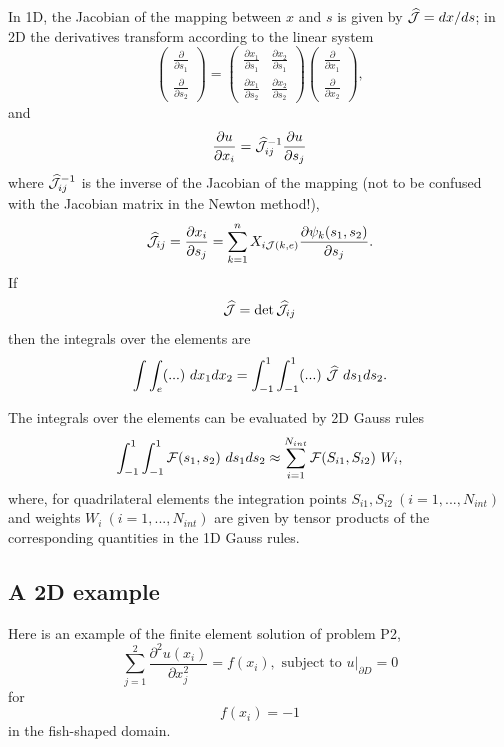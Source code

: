 In 1D, the Jacobian of the mapping between $x$ and $s$ is given by $ \widehat{\cal J} = dx/ds$; in 2D the derivatives transform according to the linear system \[ \left( \begin{array}{c} \frac{\partial }{\partial s_1} \\ \frac{\partial }{\partial s_2} \end{array} \right) = \left( \begin{array}{cc} \frac{\partial x_1 }{\partial s_1} & \frac{\partial x_2}{\partial s_1} \\ \frac{\partial x_1 }{\partial s_2} & \frac{\partial x_2}{\partial s_2} \end{array} \right) \left( \begin{array}{c} \frac{\partial }{\partial x_1} \\ \frac{\partial }{\partial x_2} \end{array} \right), \] and \[ \frac{\partial u}{\partial x_i} = \widehat{\cal J}_{ij}^{-1} \frac{\partial u}{\partial s_j} \] where $ \widehat{\cal J}_{ij}^{-1} $ is the inverse of the Jacobian of the mapping (not to be confused with the Jacobian matrix in the Newton method!), \[ \widehat{\cal J}_{ij} = \frac{\partial x_i}{\partial s_j} = \sum_{k=1}^n X_{i{\cal J}(k,e)} \frac{\partial \psi_k(s_1,s_2)}{\partial s_j}. \] If \[ \widehat{\cal J} = \det \widehat{\cal J}_{ij} \] then the integrals over the elements are \[ \int \int_e (...) \ dx_1 dx_2 = \int_{-1}^{1} \int_{-1}^{1} (...) \ \widehat{\cal J} \ ds_1 ds_2. \]

The integrals over the elements can be evaluated by 2D Gauss rules \[ \int_{-1}^1 \int_{-1}^1 {\cal F}(s_1,s_2) \ ds_1 ds_2 \approx \sum_{i=1}^{N_{int}} {\cal F}(S_{i1},S_{i2}) \ W_{i}, \] where, for quadrilateral elements the integration points $S_{i1},S_{i2} \ (i=1,...,N_{int})$ and weights $ W_{i} \ (i=1,...,N_{int})$ are given by tensor products of the corresponding quantities in the 1D Gauss rules.



\hypertarget{index_example_P2}{}\subsection{A 2\+D example}\label{index_example_P2}
Here is an example of the finite element solution of problem P2, \[ \sum_{j=1}^2 \frac{\partial^2 u(x_i)}{\partial x_j^2} = f(x_i), \mbox{\ \ \ subject to $u|_{\partial D}=0$} \] for \[ f(x_i) = -1\] in the fish-\/shaped domain.

